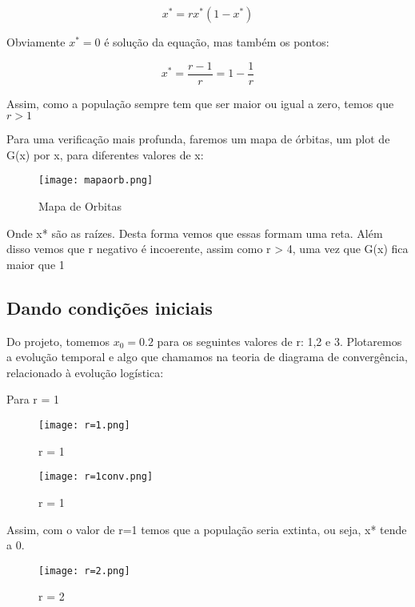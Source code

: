 \documentclass[a4paper, 12pt]{article}
\begin{document}
\begin{equation}
    x^{*} = rx^{*}(1-x^{*})
\end{equation}

Obviamente $x^{*} = 0$ é solução da equação, mas também os pontos:

\begin{equation}
    x^{*} = \frac{r - 1}{r} = 1 - \frac{1}{r}
\end{equation}

Assim, como a população sempre tem que ser maior ou igual a zero, temos que $r > 1$

Para uma verificação mais profunda, faremos um mapa de órbitas, um plot de G(x) por x, para diferentes valores de x:

\begin{figure}[H]
    \centering
    \texttt{[image: mapaorb.png]}
    \caption{Mapa de Orbitas}
\end{figure}

Onde x* são as raízes. Desta forma vemos que essas formam uma reta. Além disso vemos que r negativo é incoerente, assim como r > 4, uma vez que G(x) fica maior que 1

\subsection{Dando condições iniciais}

Do projeto, tomemos $x_{0} = 0.2$ para os seguintes valores de r: 1,2 e 3. Plotaremos a evolução temporal e algo que chamamos na teoria de diagrama de convergência, relacionado à evolução logística:

\hfill

Para r = 1

\begin{figure}[H]
    \centering
    \texttt{[image: r=1.png]}
    \caption{r = 1}
\end{figure}

\begin{figure}[H]
    \centering
    \texttt{[image: r=1conv.png]}
    \caption{r = 1}
\end{figure}

Assim, com o valor de r=1 temos que a população seria extinta, ou seja, x* tende a 0.

\begin{figure}[H]
    \centering
    \texttt{[image: r=2.png]}
    \caption{r = 2}
\end{figure}
\end{document}
